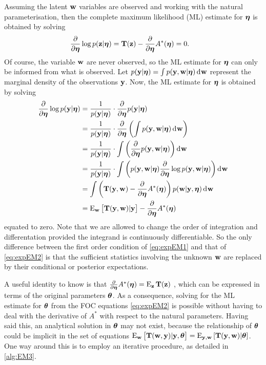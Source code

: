 Assuming the latent ${\mathbf w}$ variables are observed and working with the natural parameterisation, then the complete maximum likelihood (ML) estimate for ${\bm\eta}$ is obtained by solving 
\begin{align}\label{eq:expEM1}
  \frac{\partial}{\partial{\bm\eta}}\log p({\mathbf z}|{\bm\eta})
  &= {\mathbf T}({\mathbf z}) - \frac{\partial}{\partial{\bm\eta}} A^*({\bm\eta}) = 0.
\end{align}
Of course, the variable ${\mathbf w}$ are never observed, so the ML estimate for ${\bm\eta}$ can only be informed from what is observed.
Let $p({\mathbf y}|{\bm\eta}) = \int p({\mathbf y},{\mathbf w}|{\bm\eta}) \operatorname{d}\hspace{0.5pt}\! {\mathbf w}$ represent the marginal density of the observations ${\mathbf y}$.
Now, the ML estimate for ${\bm\eta}$  is obtained by solving
\begin{align}
  \frac{\partial}{\partial{\bm\eta}}\log p({\mathbf y}|{\bm\eta})
  &= \frac{1}{p({\mathbf y}|{\bm\eta})} \cdot \frac{\partial}{\partial{\bm\eta}}  p({\mathbf y}|{\bm\eta}) \nonumber \\
  &= \frac{1}{p({\mathbf y}|{\bm\eta})} \cdot \frac{\partial}{\partial{\bm\eta}} \left( \int p({\mathbf y},{\mathbf w}|{\bm\eta}) \operatorname{d}\hspace{0.5pt}\! {\mathbf w} \right) \nonumber \\
  &= \frac{1}{p({\mathbf y}|{\bm\eta})} \cdot \int \left( \frac{\partial}{\partial{\bm\eta}} p({\mathbf y},{\mathbf w}|{\bm\eta}) \right) \operatorname{d}\hspace{0.5pt}\! {\mathbf w} \nonumber \\
  &= \frac{1}{p({\mathbf y}|{\bm\eta})} \cdot \int \left( p({\mathbf y},{\mathbf w}|{\bm\eta}) \frac{\partial}{\partial{\bm\eta}} \log p({\mathbf y},{\mathbf w}|{\bm\eta}) \right) \operatorname{d}\hspace{0.5pt}\! {\mathbf w} \nonumber \\
  &= \int \left( {\mathbf T}({\mathbf y},{\mathbf w}) - \frac{\partial}{\partial{\bm\eta}} A^*({\bm\eta}) \right) p({\mathbf w}|{\mathbf y},{\bm\eta}) \operatorname{d}\hspace{0.5pt}\! {\mathbf w} \nonumber \\
  &= \operatorname{E}_{\mathbf w} \big[ {\mathbf T}({\mathbf y},{\mathbf w}) | {\mathbf y} \big] - \frac{\partial}{\partial{\bm\eta}} A^*({\bm\eta}) \label{eq:expEM2}
\end{align}
equated to zero.
Note that we are allowed to change the order of integration and differentation provided the integrand is continuously differentiable.
So the only difference between the first order condition of \cref{eq:expEM1} and that of \cref{eq:expEM2} is that the sufficient statistics involving the unknown ${\mathbf w}$ are replaced by their conditional or posterior expectations.

A useful identity to know is that $\frac{\partial}{\partial{\bm\eta}} A^*({\bm\eta}) = \operatorname{E}_{\mathbf z} {\mathbf T}({\mathbf z})$ \citep[Theorem 3.4.2 \& Exercise 3.32(a)]{casella2002statistical}, which can be expressed in terms of the original parameters ${\bm\theta}$.
As a consequence, solving for the ML estimate for ${\bm\theta}$ from the FOC equations \cref{eq:expEM2} is possible without having to deal with the derivative of $A^*$ with respect to the natural parameters.
Having said this, an analytical solution in ${\bm\theta}$ may not exist, because the relationship of ${\bm\theta}$ could be implicit in the set of equations $\operatorname{E}_{\mathbf w} \big[ {\mathbf T}({\mathbf w},{\mathbf y}) | {\mathbf y}, {\bm\theta} \big] = \operatorname{E}_{{\mathbf y},{\mathbf w}}\left[ {\mathbf T}({\mathbf y},{\mathbf w}) | {\bm\theta} \right]$.
One way around this is to employ an iterative procedure, as detailed in \cref{alg:EM3}.

